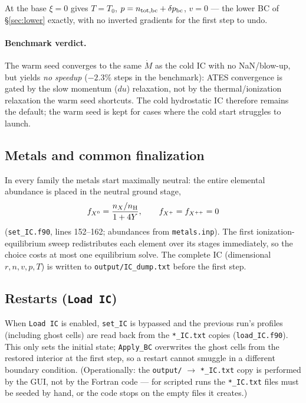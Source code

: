 \documentclass[english,a4paper]{kiseon_memo}
\begin{document}
At the base $\xi = 0$ gives $T = T_0$, $p = n_{\rm tot,bc} + \delta p_{\rm bc}$,
$v = 0$ --- the lower BC of \S\ref{sec:lower} exactly, with no
inverted gradients for the first step to undo.

\paragraph{Benchmark verdict.}
The warm seed converges to the same $\dot M$ as the cold IC with no
NaN/blow-up, but yields \emph{no speedup} (${-}2.3\%$ steps in the
benchmark): ATES convergence is gated by the slow momentum ($du$)
relaxation, not by the thermal/ionization relaxation the warm seed
shortcuts. The cold hydrostatic IC therefore remains the default; the
warm seed is kept for cases where the cold start struggles to launch.

\subsection{Metals and common finalization}

In every family the metals start maximally neutral: the entire
elemental abundance is placed in the neutral ground stage,
\begin{equation}
f_{X^0} = \frac{n_X/n_{\rm H}}{1 + 4Y}, \qquad
f_{X^{+}} = f_{X^{++}} = 0
\end{equation}
(\texttt{set\_IC.f90}, lines 152--162; abundances from
\texttt{metals.inp}). The first ionization-equilibrium sweep
redistributes each element over its stages immediately, so the choice
costs at most one equilibrium solve. The complete IC (dimensional
$r, n, v, p, T$) is written to \texttt{output/IC\_dump.txt} before the
first step.

\subsection{Restarts (\texttt{Load IC})}
\label{sec:loadic}

When \texttt{Load IC} is enabled, \texttt{set\_IC} is bypassed and the
previous run's profiles (including ghost cells) are read back from the
\texttt{*\_IC.txt} copies (\texttt{load\_IC.f90}). This only sets the
initial state; \texttt{Apply\_BC} overwrites the ghost cells from the
restored interior at the first step, so a restart cannot smuggle in a
different boundary condition. (Operationally: the \texttt{output/}
$\to$ \texttt{*\_IC.txt} copy is performed by the GUI, not by the
Fortran code --- for scripted runs the \texttt{*\_IC.txt} files must
be seeded by hand, or the code stops on the empty files it creates.)
\end{document}
